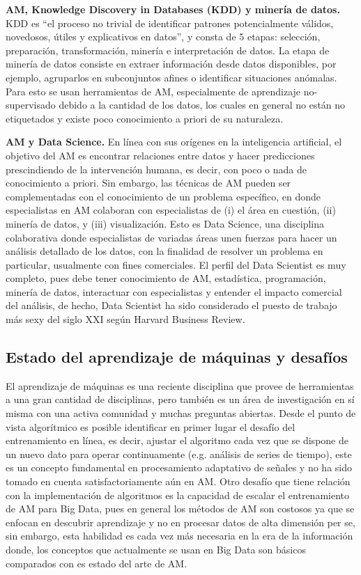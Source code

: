 \textbf{AM, Knowledge Discovery in Databases (KDD) y minería de datos.} KDD \cite{fayyad_1996} es “el proceso no trivial de identificar patrones potencialmente válidos, novedosos, útiles y explicativos en datos”, y consta de 5 etapas: selección, preparación, transformación, minería e interpretación de datos. La etapa de minería de datos  consiste en extraer información desde datos disponibles, por ejemplo, agruparlos en subconjuntos afines o identificar situaciones anómalas. Para esto se usan herramientas de AM, especialmente de aprendizaje no-supervisado debido a la cantidad de los datos, los cuales en general no están no etiquetados y existe poco conocimiento a priori de su naturaleza. 

\textbf{AM y Data Science.} En línea con sus orígenes en la inteligencia artificial, el objetivo del AM es encontrar relaciones entre datos y hacer predicciones prescindiendo de la intervención humana, es decir, con poco o nada de conocimiento a priori. Sin embargo, las técnicas de AM pueden ser complementadas con el conocimiento de un problema específico, en donde especialistas en AM colaboran con especialistas de (i) el área en cuestión, (ii) minería de datos, y (iii) visualización. Esto es Data Science, una disciplina colaborativa donde especialistas de variadas áreas unen fuerzas para hacer un análisis detallado de los datos, con la finalidad de resolver un problema en particular, usualmente con fines comerciales. El perfil del Data Scientist es muy completo, pues debe tener conocimiento de AM, estadística, programación, minería de datos, interactuar con especialistas y entender el impacto comercial del análisis, de hecho, Data Scientist ha sido considerado el puesto de trabajo más sexy del siglo XXI según Harvard Business Review.
\\

\subsection{Estado del aprendizaje de máquinas y desafíos}

El aprendizaje de máquinas es una reciente disciplina que provee de herramientas a una gran cantidad de disciplinas, pero también es un área de investigación en sí misma con una activa comunidad y muchas preguntas abiertas. Desde el punto de vista algorítmico es posible identificar en primer lugar el desafío del entrenamiento en línea, es decir, ajustar el algoritmo cada vez que se dispone de un nuevo dato para operar continuamente (e.g. análisis de series de tiempo), este es un concepto fundamental en procesamiento adaptativo de señales y no ha sido tomado en cuenta satisfactoriamente aún en AM. Otro desafío que tiene relación con la implementación de algoritmos es la capacidad de escalar el entrenamiento de AM para Big Data,  pues en general los métodos de AM son costosos ya que se enfocan en descubrir aprendizaje y no en procesar datos de alta dimensión per se, sin embargo, esta habilidad es cada vez más necesaria en la era de la información donde, los conceptos que actualmente se usan en Big Data son básicos comparados con es estado del arte de AM.

